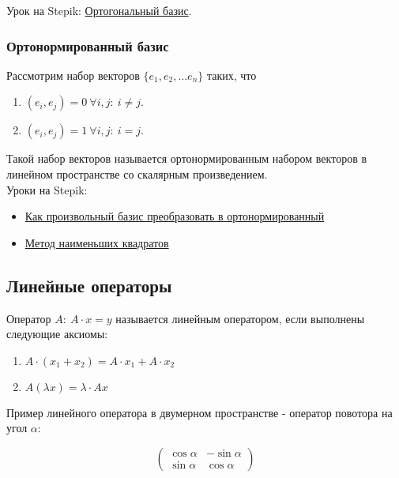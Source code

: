 \documentclass{article}
\begin{document}
Урок на Stepik: \href{https://stepik.org/lesson/9584/step/1?unit=23534}{Ортогональный базис}.

\subsubsection{Ортонормированный базис}

Рассмотрим набор векторов $\{e_1, e_2, \dots e_n\}$ таких, что

\begin{enumerate}
	\item $(e_i, e_j) = 0 \ \forall i, j: \ i \ne j$.
	\item $(e_i, e_j) = 1 \ \forall i, j: \ i = j$.
\end{enumerate}

Такой набор векторов называется ортонормированным набором векторов в линейном пространстве со скалярным произведением. \\

Уроки на Stepik:

\begin{itemize}
	\item \href{https://stepik.org/lesson/9584/step/6?unit=23534}{Как произвольный базис преобразовать в ортонормированный}
	\item \href{https://stepik.org/lesson/9584/step/13?unit=23534}{Метод наименьших квадратов}
\end{itemize}

\subsection{Линейные операторы}

Оператор $A: \ A \cdot x = y$ называется линейным оператором, если выполнены следующие аксиомы:

\begin{enumerate}
	\item $A \cdot (x_1 + x_2) = A \cdot x_1 + A \cdot x_2$
	\item $A (\lambda x) = \lambda \cdot Ax$
\end{enumerate}

Пример линейного оператора в двумерном пространстве - оператор повотора на угол $\alpha$:

\[
	\begin{pmatrix}
		\cos \alpha &  -\sin \alpha \\
		\sin \alpha & \cos \alpha
	\end{pmatrix}
\]
\end{document}
